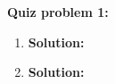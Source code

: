 \documentclass[10pt]{article}
\newenvironment{Solution}
    {\textbf{Solution:}
    
    \vspace{5mm}
    \begin{tcolorbox}
    }
    {
    \end{tcolorbox}
    \vspace{5mm}
    }
\begin{document}
\noindent\textbf{Quiz problem 1:}  
\begin{enumerate}

    \item 

\begin{Solution}

\end{Solution}

    \item 

\begin{Solution}

\end{Solution}
\end{enumerate}
\end{document}

